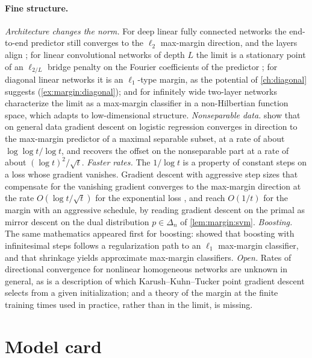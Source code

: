 \begin{refsection}
\paragraph{Fine structure.} \emph{Architecture changes the norm.} For deep linear fully connected networks the end-to-end predictor still converges to the $\ell_2$ max-margin direction, and the layers align \parencite{JiTelgarsky2019a}; for linear convolutional networks of depth $L$ the limit is a stationary point of an $\ell_{2/L}$ bridge penalty on the Fourier coefficients of the predictor \parencite{GunasekarEtAl2018b}; for diagonal linear networks it is an $\ell_1$-type margin, as the potential of \cref{ch:diagonal} suggests (\cref{ex:margin:diagonal}); and for infinitely wide two-layer networks \textcite{ChizatBach2020} characterize the limit as a max-margin classifier in a non-Hilbertian function space, which adapts to low-dimensional structure. \emph{Nonseparable data.} \Textcite{JiTelgarsky2019b} show that on general data gradient descent on logistic regression converges in direction to the max-margin predictor of a maximal separable subset, at a rate of about $\log\log t/\log t$, and recovers the offset on the nonseparable part at a rate of about $(\log t)^2/\sqrt t$. \emph{Faster rates.} The $1/\log t$ is a property of constant steps on a loss whose gradient vanishes. Gradient descent with aggressive step sizes that compensate for the vanishing gradient converges to the max-margin direction at the rate $O(\log t/\sqrt t)$ for the exponential loss \parencite{NacsonEtAl2019}, and \textcite{JiTelgarsky2021} reach $O(1/t)$ for the margin with an aggressive schedule, by reading gradient descent on the primal as mirror descent on the dual distribution $p\in\Delta_n$ of \cref{lem:margin:svm}. \emph{Boosting.} The same mathematics appeared first for boosting: \textcite{RossetZhuHastie2004} showed that boosting with infinitesimal steps follows a regularization path to an $\ell_1$ max-margin classifier, and \textcite{Telgarsky2013} that shrinkage yields approximate max-margin classifiers. \emph{Open.} Rates of directional convergence for nonlinear homogeneous networks are unknown in general, as is a description of which Karush--Kuhn--Tucker point gradient descent selects from a given initialization; and a theory of the margin at the finite training times used in practice, rather than in the limit, is missing.

\section{Model card}\label{sec:margin:card}


\end{refsection}
